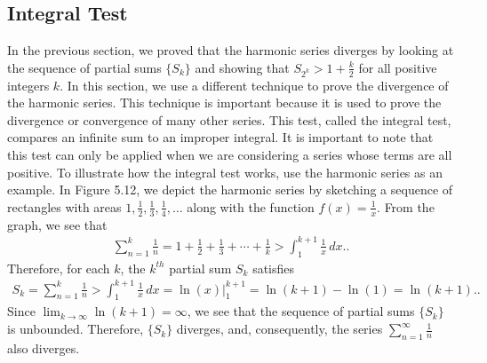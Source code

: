 \documentclass{report}
\begin{document}
    \subsection*{Integral Test}
    \bigbreak \noindent     
    In the previous section, we proved that the harmonic series diverges by looking at the sequence of partial sums $\{S_k\}$ and showing that $S_{2^{k}} > 1 + \frac{k}{2}$ for all positive integers $k$. In this section, we use a different technique to prove the divergence of the harmonic series. This technique is important because it is used to prove the divergence or convergence of many other series. This test, called the integral test, compares an infinite sum to an improper integral. It is important to note that this test can only be applied when we are considering a series whose terms are all positive.
    \bigbreak \noindent 
    To illustrate how the integral test works, use the harmonic series as an example. In Figure 5.12, we depict the harmonic series by sketching a sequence of rectangles with areas $1, \frac{1}{2}, \frac{1}{3}, \frac{1}{4}, \ldots$ along with the function $f(x) = \frac{1}{x}$. From the graph, we see that
    \begin{align*}
        \sum_{n=1}^{k} \frac{1}{n} = 1 + \frac{1}{2} + \frac{1}{3} + \cdots + \frac{1}{k} > \int_{1}^{k+1} \frac{1}{x} \, dx.
    .\end{align*}
    \bigbreak \noindent 
    Therefore, for each  $k$, the  $k^{th}$ partial sum  $S_{k}$ satisfies
    \begin{align*}
        S_k = \sum_{n=1}^{k} \frac{1}{n} > \int_{1}^{k+1} \frac{1}{x} \, dx = \ln(x) \Bigg|_{1}^{k+1} = \ln(k+1) - \ln(1) = \ln(k+1).
    .\end{align*}
    \pagebreak \bigbreak \noindent 
    Since $\lim_{k \to \infty} \ln(k+1) = \infty$, we see that the sequence of partial sums $\{S_k\}$ is unbounded. Therefore, $\{S_k\}$ diverges, and, consequently, the series $\sum_{n=1}^{\infty} \frac{1}{n}$ also diverges.
\end{document}
